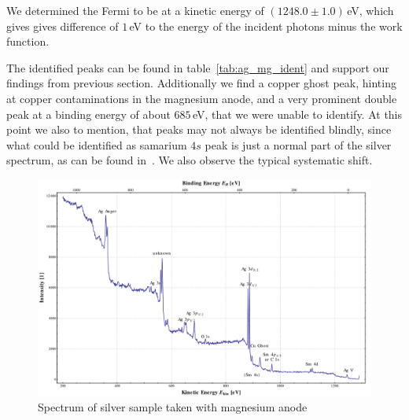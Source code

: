 \documentclass[a4paper,10pt]{scrartcl}
\begin{document}
We determined the Fermi to be at a kinetic energy of $(1248.0 \pm 1.0)\,$eV, which gives gives difference of $1\,$eV to the energy of the incident photons minus the work function.

The identified peaks can be found in table~\ref{tab:ag_mg_ident} and support our findings from previous section. Additionally we find a copper ghost peak, hinting at copper contaminations in the magnesium anode, and a very prominent double peak at a binding energy of about $685\,$eV, that we were unable to identify. At this point we also to mention, that peaks may not always be identified blindly, since what could be identified as samarium $4s$ peak is just a normal part of the silver spectrum, as can be found in~\cite{handbook}. We also observe the typical systematic shift.

\begin{figure}[h]
\centering
\includegraphics[scale=0.3]{img/silver_binding_mg}
\caption{Spectrum of silver sample taken with magnesium anode \label{fig:ag_mg}}
\end{figure}
\end{document}

